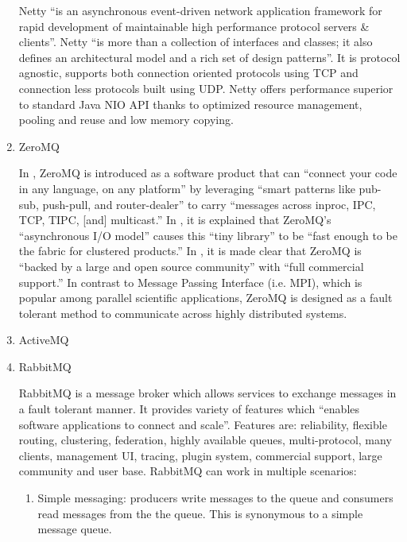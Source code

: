 \begin{enumerate}
Netty \label{\detokenize{i524/technologies:id311}}{\hyperref[\detokenize{i524/technologies:www-netty}]{\sphinxcrossref{{[}263{]}}}} ``is an asynchronous event-driven network
application framework for rapid development of maintainable high
performance protocol servers \& clients''. Netty \label{\detokenize{i524/technologies:id312}}{\hyperref[\detokenize{i524/technologies:netty-book}]{\sphinxcrossref{{[}264{]}}}}
``is more than a collection of interfaces and classes; it also
defines an architectural model and a rich set of design
patterns''. It is protocol agnostic, supports both connection
oriented protocols using TCP and connection less protocols built
using UDP. Netty offers performance superior to standard Java NIO
API thanks to optimized resource management, pooling and reuse
and low memory copying.

\item {} 
ZeroMQ

In \label{\detokenize{i524/technologies:id313}}{\hyperref[\detokenize{i524/technologies:www-zeromq}]{\sphinxcrossref{{[}265{]}}}}, ZeroMQ is introduced as a software product
that can ``connect your code in any language, on any platform'' by
leveraging ``smart patterns like pub-sub, push-pull, and
router-dealer'' to carry ``messages across inproc, IPC, TCP, TIPC,
{[}and{]} multicast.'' In \label{\detokenize{i524/technologies:id314}}{\hyperref[\detokenize{i524/technologies:www-zeromq2}]{\sphinxcrossref{{[}266{]}}}}, it is explained that
ZeroMQ's ``asynchronous I/O model'' causes this ``tiny library'' to
be ``fast enough to be the fabric for clustered products.'' In
\label{\detokenize{i524/technologies:id315}}{\hyperref[\detokenize{i524/technologies:www-zeromq}]{\sphinxcrossref{{[}265{]}}}}, it is made clear that ZeroMQ is ``backed by a
large and open source community'' with ``full commercial support.''
In contrast to Message Passing Interface (i.e. MPI), which is
popular among parallel scientific applications, ZeroMQ is
designed as a fault tolerant method to communicate across highly
distributed systems.

\item {} 
ActiveMQ

\item {} 
RabbitMQ

RabbitMQ is a message broker \label{\detokenize{i524/technologies:id316}}{\hyperref[\detokenize{i524/technologies:www-rabbitmq}]{\sphinxcrossref{{[}267{]}}}} which allows
services to exchange messages in a fault tolerant manner. It
provides variety of features which “enables software applications
to connect and scale”. Features are: reliability, flexible
routing, clustering, federation, highly available queues,
multi-protocol, many clients, management UI, tracing, plugin
system, commercial support, large community and user
base. RabbitMQ can work in multiple scenarios:
\begin{enumerate}
\item {} 
Simple messaging: producers write messages to the queue and
consumers read messages from the the queue. This is synonymous
to a simple message queue.


\end{enumerate}
\end{enumerate}
